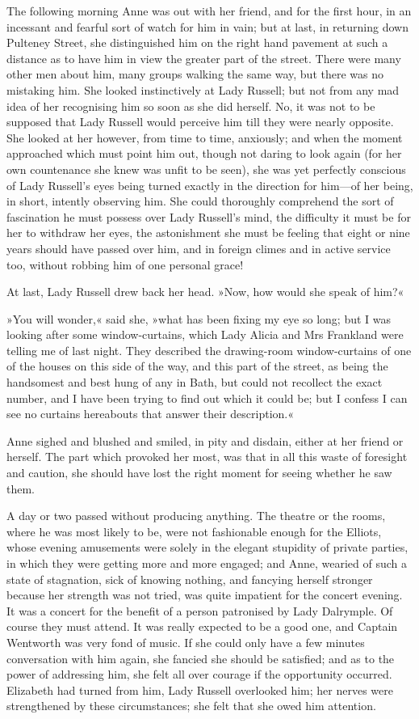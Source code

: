 The following morning Anne was out with her friend, and for the first hour, in an incessant and fearful sort of watch for him in vain; but at last, in returning down Pulteney Street, she distinguished him on the right hand pavement at such a distance as to have him in view the greater part of the street. There were many other men about him, many groups walking the same way, but there was no mistaking him. She looked instinctively at Lady Russell; but not from any mad idea of her recognising him so soon as she did herself. No, it was not to be supposed that Lady Russell would perceive him till they were nearly opposite. She looked at her however, from time to time, anxiously; and when the moment approached which must point him out, though not daring to look again (for her own countenance she knew was unfit to be seen), she was yet perfectly conscious of Lady Russell's eyes being turned exactly in the direction for him—of her being, in short, intently observing him. She could thoroughly comprehend the sort of fascination he must possess over Lady Russell's mind, the difficulty it must be for her to withdraw her eyes, the astonishment she must be feeling that eight or nine years should have passed over him, and in foreign climes and in active service too, without robbing him of one personal grace!

At last, Lady Russell drew back her head. »Now, how would she speak of him?«

»You will wonder,« said she, »what has been fixing my eye so long; but I was looking after some window-curtains, which Lady Alicia and Mrs Frankland were telling me of last night. They described the drawing-room window-curtains of one of the houses on this side of the way, and this part of the street, as being the handsomest and best hung of any in Bath, but could not recollect the exact number, and I have been trying to find out which it could be; but I confess I can see no curtains hereabouts that answer their description.«

Anne sighed and blushed and smiled, in pity and disdain, either at her friend or herself. The part which provoked her most, was that in all this waste of foresight and caution, she should have lost the right moment for seeing whether he saw them.

A day or two passed without producing anything. The theatre or the rooms, where he was most likely to be, were not fashionable enough for the Elliots, whose evening amusements were solely in the elegant stupidity of private parties, in which they were getting more and more engaged; and Anne, wearied of such a state of stagnation, sick of knowing nothing, and fancying herself stronger because her strength was not tried, was quite impatient for the concert evening. It was a concert for the benefit of a person patronised by Lady Dalrymple. Of course they must attend. It was really expected to be a good one, and Captain Wentworth was very fond of music. If she could only have a few minutes conversation with him again, she fancied she should be satisfied; and as to the power of addressing him, she felt all over courage if the opportunity occurred. Elizabeth had turned from him, Lady Russell overlooked him; her nerves were strengthened by these circumstances; she felt that she owed him attention.

